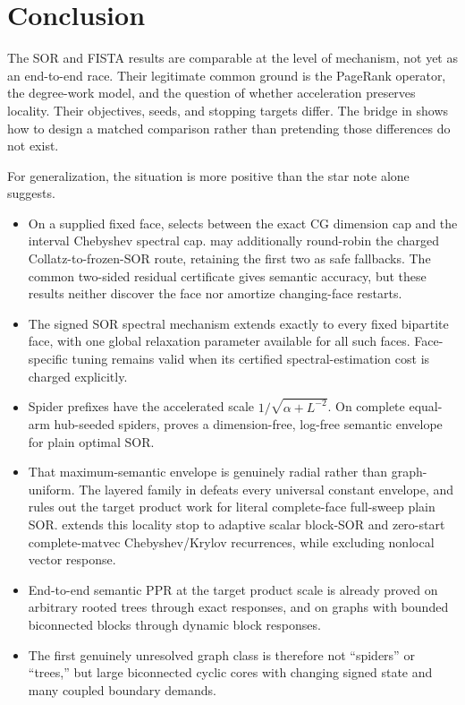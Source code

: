 \section{Conclusion}
\label{sec:conclusion}

The SOR and FISTA results are comparable at the level of mechanism, not yet
as an end-to-end race.  Their legitimate common ground is the PageRank
operator, the degree-work model, and the question of whether acceleration
preserves locality.  Their objectives, seeds, and stopping targets differ.
The bridge in  shows how
to design a matched comparison rather than pretending those differences do
not exist.

For generalization, the situation is more positive than the star note alone
suggests.

\begin{itemize}[leftmargin=*]
\item On a supplied fixed face,  selects
      between the exact CG dimension cap and the interval Chebyshev spectral
      cap.   may additionally round-robin
      the charged Collatz-to-frozen-SOR route, retaining the first two as safe
      fallbacks.  The common two-sided residual certificate gives semantic
      accuracy, but these results neither discover the face nor amortize
      changing-face restarts.
\item The signed SOR spectral mechanism extends exactly to every fixed
      bipartite face, with one global relaxation parameter available for all
      such faces.  Face-specific tuning remains valid when its certified
      spectral-estimation cost is charged explicitly.
\item Spider prefixes have the accelerated scale
      $1/\sqrt{\alpha+L^{-2}}$.  On complete equal-arm hub-seeded spiders,
       proves a dimension-free, log-free
      semantic envelope for plain optimal SOR.
\item That maximum-semantic envelope is genuinely radial rather than
      graph-uniform.  The layered family in
       defeats every universal constant
      envelope, and  rules out the
      target product work for literal complete-face full-sweep plain SOR.
       extends this locality
      stop to adaptive scalar block-SOR and zero-start complete-matvec
      Chebyshev/Krylov recurrences, while excluding nonlocal vector response.
\item End-to-end semantic PPR at the target product scale is already proved on
      arbitrary rooted trees through exact responses, and on graphs with
      bounded biconnected blocks through dynamic block responses.
\item The first genuinely unresolved graph class is therefore not ``spiders''
      or ``trees,'' but large biconnected cyclic cores with changing signed
      state and many coupled boundary demands.
\end{itemize}

